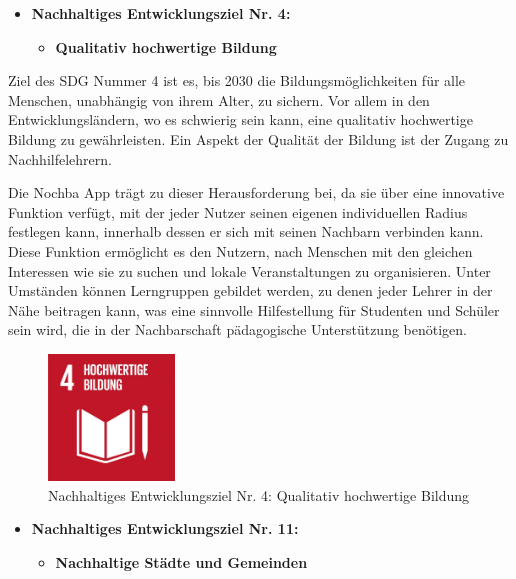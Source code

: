 \begin{itemize}
    \item \textbf{Nachhaltiges Entwicklungsziel Nr. 4:}
          \begin{itemize}
              \item \textbf{Qualitativ hochwertige Bildung}
          \end{itemize}
\end{itemize}

Ziel des SDG Nummer 4 ist es, bis 2030 die Bildungsmöglichkeiten für alle Menschen, unabhängig von ihrem Alter, zu sichern. Vor allem in den Entwicklungsländern, wo es schwierig sein kann, eine qualitativ hochwertige Bildung zu gewährleisten. Ein Aspekt der Qualität der Bildung ist der Zugang zu Nachhilfelehrern.

Die Nochba App trägt zu dieser Herausforderung bei, da sie über eine innovative Funktion verfügt, mit der jeder Nutzer seinen eigenen individuellen Radius festlegen kann, innerhalb dessen er sich mit seinen Nachbarn verbinden kann. Diese Funktion ermöglicht es den Nutzern, nach Menschen mit den gleichen Interessen wie sie zu suchen und lokale Veranstaltungen zu organisieren. Unter Umständen können Lerngruppen gebildet werden, zu denen jeder Lehrer in der Nähe beitragen kann, was eine sinnvolle Hilfestellung für Studenten und Schüler sein wird, die in der Nachbarschaft pädagogische Unterstützung benötigen.

\begin{figure}[H]
    \centering
    \includegraphics[width=0.3\textwidth]{pics/SDG-04.jpg}
    \caption{Nachhaltiges Entwicklungsziel Nr. 4: Qualitativ hochwertige Bildung}
    \label{fig:SDG04}
\end{figure}

\begin{itemize}
    \item \textbf{Nachhaltiges Entwicklungsziel Nr. 11:}
          \begin{itemize}
              \item \textbf{Nachhaltige Städte und Gemeinden}
          \end{itemize}
\end{itemize}

